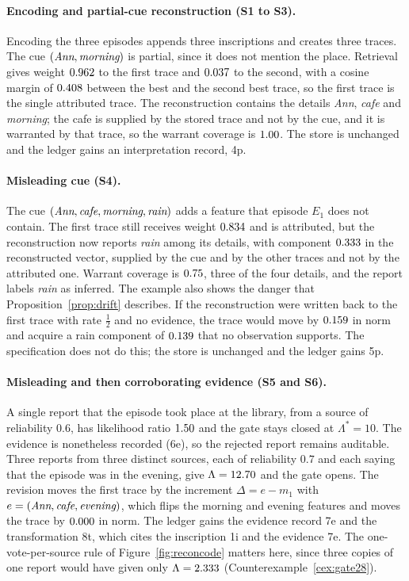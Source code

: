 \paragraph{Encoding and partial-cue reconstruction (S1 to S3).} Encoding the three episodes appends three inscriptions and creates three traces. The cue $(\emph{Ann},\emph{morning})$ is partial, since it does not mention the place. Retrieval gives weight $0.962$ to the first trace and $0.037$ to the second, with a cosine margin of $0.408$ between the best and the second best trace, so the first trace is the single attributed trace. The reconstruction contains the details \emph{Ann}, \emph{cafe} and \emph{morning}; the cafe is supplied by the stored trace and not by the cue, and it is warranted by that trace, so the warrant coverage is $1.00$. The store is unchanged and the ledger gains an interpretation record, 4p.

\paragraph{Misleading cue (S4).} The cue $(\emph{Ann},\emph{cafe},\emph{morning},\emph{rain})$ adds a feature that episode $E_1$ does not contain. The first trace still receives weight $0.834$ and is attributed, but the reconstruction now reports \emph{rain} among its details, with component $0.333$ in the reconstructed vector, supplied by the cue and by the other traces and not by the attributed one. Warrant coverage is $0.75$, three of the four details, and the report labels \emph{rain} as inferred. The example also shows the danger that Proposition~\ref{prop:drift} describes. If the reconstruction were written back to the first trace with rate $\tfrac12$ and no evidence, the trace would move by $0.159$ in norm and acquire a rain component of $0.139$ that no observation supports. The specification does not do this; the store is unchanged and the ledger gains 5p.

\paragraph{Misleading and then corroborating evidence (S5 and S6).} A single report that the episode took place at the library, from a source of reliability $0.6$, has likelihood ratio $1.50$ and the gate stays closed at $\Lambda^\ast=10$. The evidence is nonetheless recorded (6e), so the rejected report remains auditable. Three reports from three distinct sources, each of reliability $0.7$ and each saying that the episode was in the evening, give $\Lambda=12.70$ and the gate opens. The revision moves the first trace by the increment $\Delta=e-m_1$ with $e=(\emph{Ann},\emph{cafe},\emph{evening})$, which flips the morning and evening features and moves the trace by $0.000$ in norm. The ledger gains the evidence record 7e and the transformation 8t, which cites the inscription 1i and the evidence 7e. The one-vote-per-source rule of Figure~\ref{fig:reconcode} matters here, since three copies of one report would have given only $\Lambda=2.333$ (Counterexample~\ref{cex:gate28}).

